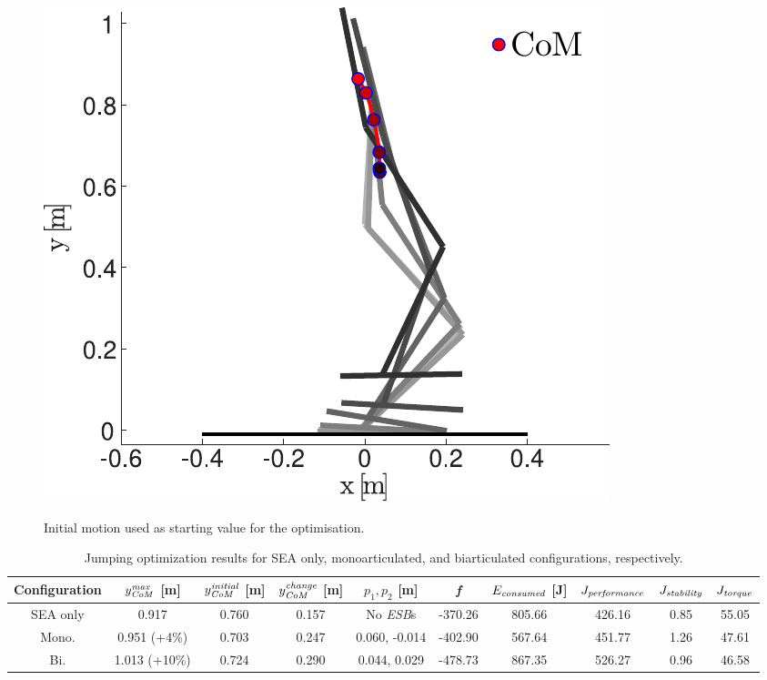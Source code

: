 \documentclass[letterpaper, 10 pt, conference]{ieeeconf}  %
\begin{document}
\begin{figure}[ht]
	\centering
	{\includegraphics[width=0.55\linewidth]{initialguess_edited}
	}%
	\caption{Initial motion used as starting value for the optimisation.}
	\label{fig:seq}	
\end{figure}

\begin{table}[ht]
	\caption{Jumping optimization results for SEA only, monoarticulated, and biarticulated configurations, respectively.}
	\label{table:maxheight}
	\begin{center}
		\begin{tabular}[t]{c|c|c|c|c|c|c|c|c|c}
			Configuration &  $y_{\text{\textit{CoM}}}^{\text{\textit{max}}}$ [m] & $y_{\text{\textit{CoM}}}^{\text{\textit{initial}}}$ [m]& $y_{\text{\textit{CoM}}}^{\text{\textit{change}}}$ [m]& $p_1,p_2$ [m] & \textit{f} & $E_{\text{\textit{consumed}}}$ [J] & $J_{\text{\textit{performance}}}$ & $J_{\text{\textit{stability}}}$ & $J_{\text{\textit{torque}}}$ \\ 
			\hline
			SEA only	& 0.917 & 0.760 & 0.157 & No \textit{ESB}s	& -370.26 & 805.66 & 426.16 & 0.85 & 55.05\\
			\hline
			Mono.		& 0.951 (+4\%) & 0.703 & 0.247 & 0.060, -0.014	& -402.90 & 567.64 & 451.77 & 1.26 & 47.61 \\
			\hline
			Bi.			& 1.013 (+10\%) & 0.724 & 0.290 & 0.044, 0.029		& -478.73 & 867.35 & 526.27 & 0.96 & 46.58
		\end{tabular}
	\end{center}
\end{table}
\end{document}
